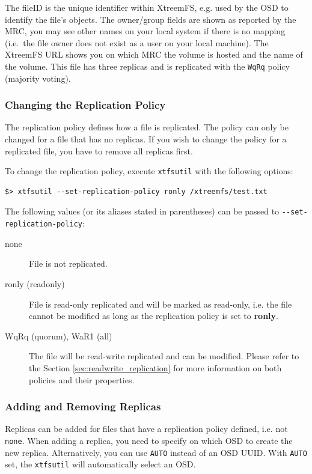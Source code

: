 \documentclass[a4paper,10pt]{book}
\begin{document}
The fileID is the unique identifier within XtreemFS, e.g. used by the OSD to identify the file's objects. The owner/group fields are shown as reported by the MRC, you may see other names on your local system if there is no mapping (i.e.\ the file owner does not exist as a user on your local machine). The XtreemFS URL shows you on which MRC the volume is hosted and the name of the volume. This file has three replicas and is replicated with the \texttt{WqRq} policy (majority voting).

\subsubsection{Changing the Replication Policy}

The replication policy defines how a file is replicated. The policy can only be changed for a file that has no replicas. If you wish to change the policy for a replicated file, you have to remove all replicas first.

To change the replication policy, execute \texttt{xtfsutil} with the following options:

\begin{verbatim}
$> xtfsutil --set-replication-policy ronly /xtreemfs/test.txt
\end{verbatim}

The following values (or its aliases stated in parentheses) can be passed to \verb|--set-replication-policy|:
\begin{description}
  \item[none] File is not replicated.
  \item[ronly (readonly)] File is read-only replicated and will be marked as read-only, i.e. the file cannot be modified as long as the replication policy is set to \textbf{ronly}.
  \item[WqRq (quorum), WaR1 (all)] The file will be read-write replicated and can be modified. Please refer to the Section \ref{sec:readwrite_replication} for more information on both policies and their properties.
\end{description}


\subsubsection{Adding and Removing Replicas}

Replicas can be added for files that have a replication policy defined, i.e. not \texttt{none}. When adding a replica, you need to specify on which OSD to create the new replica. Alternatively, you can use \texttt{AUTO} instead of an OSD UUID. With \texttt{AUTO} set, the \texttt{xtfsutil} will automatically select an OSD.
\end{document}
